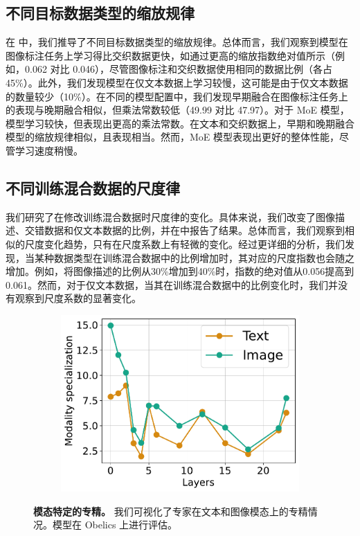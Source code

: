 \subsection{不同目标数据类型的缩放规律}
在  中，我们推导了不同目标数据类型的缩放规律。总体而言，我们观察到模型在图像标注任务上学习得比交织数据更快，如通过更高的缩放指数绝对值所示（例如，0.062 对比 0.046），尽管图像标注和交织数据使用相同的数据比例（各占 45\%）。此外，我们发现模型在仅文本数据上学习较慢，这可能是由于仅文本数据的数量较少（10\%）。在不同的模型配置中，我们发现早期融合在图像标注任务上的表现与晚期融合相似，但乘法常数较低（49.99 对比 47.97）。对于 MoE 模型，模型学习较快，但表现出更高的乘法常数。在文本和交织数据上，早期和晚期融合模型的缩放规律相似，且表现相当。然而，MoE 模型表现出更好的整体性能，尽管学习速度稍慢。
\subsection{不同训练混合数据的尺度律}

我们研究了在修改训练混合数据时尺度律的变化。具体来说，我们改变了图像描述、交错数据和仅文本数据的比例，并在中报告了结果。总体而言，我们观察到相似的尺度变化趋势，只有在尺度系数上有轻微的变化。经过更详细的分析，我们发现，当某种数据类型在训练混合数据中的比例增加时，其对应的尺度指数也会随之增加。例如，将图像描述的比例从30\%增加到40\%时，指数的绝对值从0.056提高到0.061。然而，对于仅文本数据，当其在训练混合数据中的比例变化时，我们并没有观察到尺度系数的显著变化。

\begin{figure}
        \vspace{-4mm}
        \centering
        \captionsetup{type=figure}
        \begin{subfigure}[t]{\linewidth}
            \includegraphics[width=1.0\textwidth]{assets/moes/specialization/model1088/modality_specialization_1088_150_across_layers.pdf}
        \end{subfigure}

        \caption{\textbf{模态特定的专精。} 我们可视化了专家在文本和图像模态上的专精情况。模型在 Obelics 上进行评估。}
        \label{fig:app_moes_specialization}
\end{figure}
